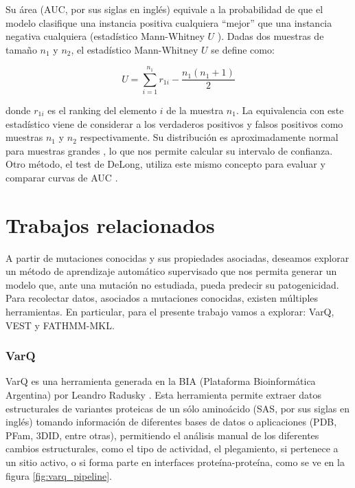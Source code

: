 \begin{itemize}
    Su área (AUC, por sus siglas en inglés) equivale a la probabilidad de que el modelo clasifique una instancia positiva cualquiera ``mejor'' que una instancia negativa cualquiera (estadístico Mann-Whitney $U$ \cite{doi:10.1256/003590002320603584}). Dadas dos muestras de tamaño $n_1$ y $n_2$, el estadístico Mann-Whitney $U$ se define como:
    
    \begin{equation*}
        U = \sum_{i = 1}^{n_1} r_{1i} - \frac{n_1 (n_1 + 1)}{2}
    \end{equation*}
    
    donde $r_{1i}$ es el ranking del elemento $i$ de la muestra $n_1$. La equivalencia con este estadístico viene de considerar a los verdaderos positivos y falsos positivos como muestras $n_1$ y $n_2$ respectivamente. Su distribución es aproximadamente normal para muestras grandes \cite{mann1947}, lo que nos permite calcular su intervalo de confianza. Otro método, el test de DeLong, utiliza este mismo concepto para evaluar y comparar curvas de AUC \cite{DeLong}.

\end{itemize}



\section{Trabajos relacionados}

A partir de mutaciones conocidas y sus propiedades asociadas, deseamos explorar un método de aprendizaje automático supervisado que nos permita generar un modelo que, ante una mutación no estudiada, pueda predecir su patogenicidad. Para recolectar datos, asociados a mutaciones conocidas, existen múltiples herramientas. En particular, para el presente trabajo vamos a explorar: VarQ, VEST y FATHMM-MKL.

\subsubsection{VarQ}

VarQ es una herramienta generada en la BIA (Plataforma Bioinformática Argentina) por Leandro Radusky \cite{Radusky2017}. Esta herramienta permite extraer datos estructurales de variantes proteicas de un sólo aminoácido (SAS, por sus siglas en inglés) tomando información de diferentes bases de datos o aplicaciones (PDB, PFam, 3DID, entre otras), permitiendo el análisis manual de los diferentes cambios estructurales, como el tipo de actividad, el plegamiento, si pertenece a un sitio activo, o si forma parte en interfaces proteína-proteína, como se ve en la figura \ref{fig:varq_pipeline}. 

